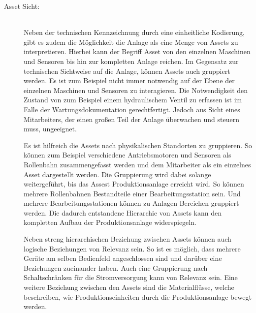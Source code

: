 \begin{description}



    \item[Asset Sicht:]\hfill \\
    Neben der technischen Kennzeichnung durch eine einheitliche Kodierung, gibt es zudem die Möglichkeit die Anlage als eine Menge von \glqq Assets\grqq{} zu interpretieren. Hierbei kann der Begriff \glqq Asset\grqq{} von den einzelnen Maschinen und Sensoren bis hin zur kompletten Anlage reichen. Im Gegensatz zur technischen Sichtweise auf die Anlage, können Assets auch gruppiert werden. Es ist zum Beispiel nicht immer notwendig auf der Ebene der einzelnen Maschinen und Sensoren zu interagieren. Die Notwendigkeit den Zustand von zum Beispiel einem hydraulischem Ventil zu erfassen ist im Falle der Wartungsdokumentation gerechtfertigt. Jedoch aus Sicht eines Mitarbeiters, der einen großen Teil der Anlage überwachen und steuern muss, ungeeignet.

    Es ist hilfreich die Assets nach physikalischen Standorten zu gruppieren. So können zum Beispiel verschiedene Antriebsmotoren und Sensoren als \glqq Rollenbahn\grqq{} zusammengefasst werden und dem Mitarbeiter als ein einzelnes Asset dargestellt werden. Die Gruppierung wird dabei solange weitergeführt, bis das Assest \glqq Produktionsanlage\grqq{} erreicht wird. So können mehrere \glqq Rollenbahnen\grqq{} Bestandteile einer \glqq Bearbeitungsstation\grqq{} sein. Und mehrere \glqq Bearbeitungsstationen\grqq{} können zu \glqq Anlagen-Bereichen\grqq{} gruppiert werden. Die dadurch entstandene Hierarchie von Assets kann den kompletten Aufbau der Produktionsanlage widerspiegeln.

    Neben streng hierarchischen Beziehung zwischen Assets können auch logische Beziehungen von Relevanz sein. So ist es möglich, dass mehrere Geräte am selben Bedienfeld angeschlossen sind und darüber eine Beziehungen zueinander haben. Auch eine Gruppierung nach Schaltschränken für die Stromversorgung kann von Relevanz sein. Eine weitere Beziehung zwischen den Assets sind die Materialflüsse, welche beschreiben, wie Produktionseinheiten durch die Produktionsanlage bewegt werden.
    
\end{description}

